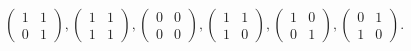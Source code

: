 \begin{equation*}
  \begin{pmatrix}
    1 & 1\\
    0 & 1
  \end{pmatrix},
  \begin{pmatrix}
    1 & 1\\
    1 & 1
  \end{pmatrix},
  \begin{pmatrix}
    0 & 0\\
    0 & 0
  \end{pmatrix},
  \begin{pmatrix}
    1 & 1\\
    1 & 0
  \end{pmatrix},
  \begin{pmatrix}
    1 & 0\\
    0 & 1
  \end{pmatrix},
  \begin{pmatrix}
    0 & 1\\
    1 & 0
  \end{pmatrix}.
\end{equation*}

